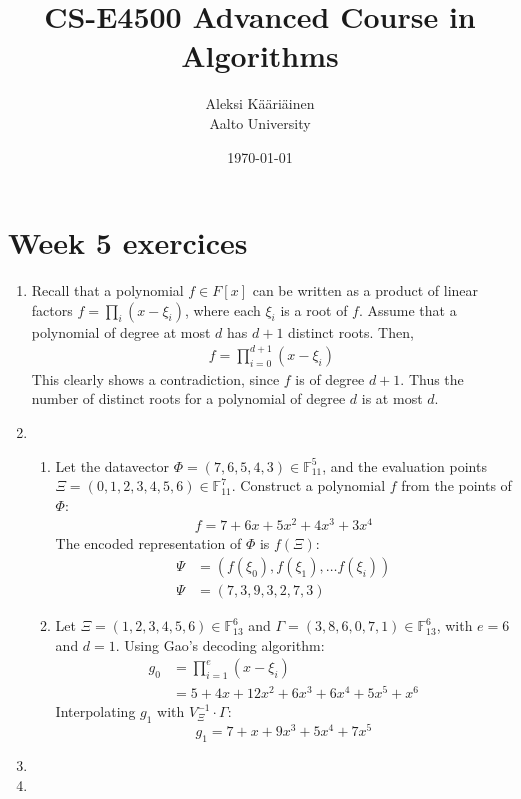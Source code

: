 \documentclass[11pt,a4paper]{article}
\title{CS-E4500 Advanced Course in Algorithms}
\author{Aleksi Kääriäinen  \\
	Aalto University  \\
	}
\begin{document}
\date{\today}

\maketitle

\newpage

\section*{Week 5 exercices}

\begin{enumerate}
    \item Recall that a polynomial $f \in F[x]$ can be written as a product of linear factors $f = \prod_{i}(x - \xi_i)$,
          where each $\xi_i$ is a root of $f$. Assume that a polynomial of degree at most $d$ has $d + 1$ distinct roots. Then,
          \begin{align*}
              f = \prod_{i = 0}^{d + 1}(x - \xi_i)
          \end{align*}
          This clearly shows a contradiction, since $f$ is of degree $d + 1$. Thus the number of distinct roots for a polynomial
          of degree $d$ is at most $d$.
          \newpage

    \item \begin{enumerate}
              \item Let the datavector $\Phi = (7, 6, 5, 4, 3) \in \mathbb{F}^5_{11}$, and the evaluation points
                    $\Xi = (0, 1, 2, 3, 4, 5, 6) \in \mathbb{F}_{11}^7$. Construct a polynomial $f$ from the points of $\Phi$:
                    \begin{align*}
                        f = 7 + 6x + 5x^2 + 4x^3 + 3x^4
                    \end{align*}
                    The encoded representation of $\Phi$ is $f(\Xi)$:
                    \begin{align*}
                        \Psi & = (f(\xi_0), f(\xi_1), \dots f(\xi_i)) \\
                        \Psi & = (7, 3, 9, 3, 2, 7, 3)
                    \end{align*}

              \item Let $\Xi = (1, 2, 3, 4, 5, 6) \in \mathbb{F}_{13}^6$ and $\Gamma = (3, 8, 6, 0, 7, 1) \in \mathbb{F}_{13}^6$,
                    with $e = 6$ and $d = 1$. Using Gao's decoding algorithm:
                    \begin{align*}
                        g_0 & = \prod_{i = 1}^{e}(x - \xi_i) \\
                            & = 5 + 4x + 12x^2 + 6x^3 + 6x^4 + 5x^5 + x^6
                    \end{align*}
                    Interpolating $g_1$ with $V_\Xi^{-1} \cdot \Gamma$:
                    \[ g_1 = 7 + x + 9x^3 + 5x^4 + 7x^5\]
          \end{enumerate}

          \newpage

    \item

          \newpage

    \item

          \newpage
\end{enumerate}
\end{document}
